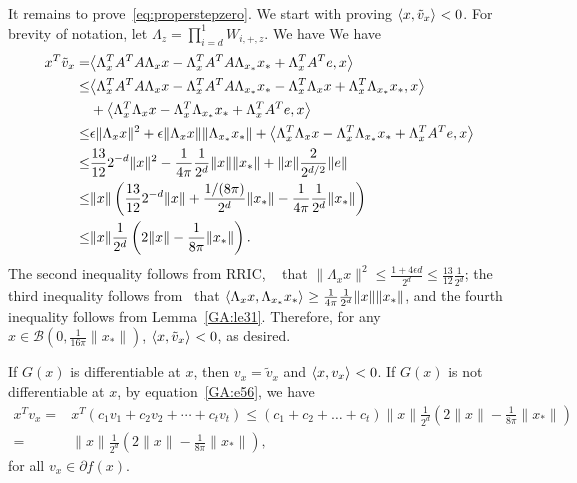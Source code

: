 It remains to prove~\eqref{eq:properstepzero}.
We start with proving $\inner[]{x}{\tilde{v}_x} < 0$.
For brevity of notation, let $\Lambda_{z} = \prod_{i = d}^1 W_{i, +, z}$. We have
We have
\begin{align*}
x^T \tilde{v}_x =&
\inner[]{ \Lambda_x^T A^T A \Lambda_x x - \Lambda_x^T A^T A \Lambda_{x_*} x_* + \Lambda_x^T A^T e }{x} \\
\leq& \inner[]{ \Lambda_x^T A^T A \Lambda_x x - \Lambda_x^T A^T A \Lambda_{x_*} x_* - \Lambda_x^T \Lambda_x x + \Lambda_x^T \Lambda_{x_*} x_* }{x} \\
&+ \inner[]{ \Lambda_x^T \Lambda_x x - \Lambda_x^T \Lambda_{x_*} x_* + \Lambda_x^T A^T e }{x}  \\
\leq& \epsilon \|\Lambda_x x\|^2 + \epsilon \|\Lambda_x x\| \|\Lambda_{x_*} x_*\| + \inner[]{ \Lambda_x^T \Lambda_x x - \Lambda_x^T \Lambda_{x_*} x_* + \Lambda_x^T A^T e }{x}  \\
\leq&
\frac{13}{12}2^{-d} \|x\|^2 - \frac{1}{4 \pi} \frac{1}{2^d} \|x\| \|x_*\| +
\|x\| \frac{2}{2^{d/2}} \|e\| \\
\leq&
\|x\| \left( \frac{13}{12}2^{-d} \|x\| +
\frac{1/(8\pi)}{2^{d}} \|x_*\|
- \frac{1}{4 \pi} \frac{1}{2^d} \|x_*\| \right) \\
\leq&
\|x\| \frac{1}{2^d} \left( 2\|x\| - \frac{1}{8 \pi} \|x_*\| \right).
\end{align*}
The second inequality follows from RRIC, ~\cite[(10)]{HV17} that $\|\Lambda_x x\|^2 \leq \frac{1+4\epsilon d}{2^d} \leq \frac{13}{12} \frac{1}{2^d}$; the third inequality follows from~\cite[Lemma~6]{HV17} that $\inner[]{\Lambda_x x}{\Lambda_{x_*} x_*} \geq \frac{1}{4 \pi} \frac{1}{2^d} \|x\| \|x_*\|$, and the fourth inequality follows from Lemma~\ref{GA:le31}.
Therefore, for any $x \in \mathcal{B}(0, \frac{1}{16\pi} \|x_*\|)$, $\inner[]{x}{ \tilde{v}_{x} } < 0$,  as desired.

If $G(x)$ is differentiable at $x$, then $v_x = \tilde{v}_x$ and $\inner[]{x}{{v}_x} < 0$. If $G(x)$ is not differentiable at $x$, by equation~\eqref{GA:e56}, we have
\begin{align*}
x^T {v}_x =& x^T (c_1 v_1 + c_2 v_2 + \cdots + c_t v_t) \leq (c_1 + c_2 + \ldots + c_t) \|x\| \frac{1}{2^d} \left( 2\|x\| - \frac{1}{8 \pi} \|x_*\| \right) \\
=& \|x\| \frac{1}{2^d} \left( 2\|x\| - \frac{1}{8 \pi} \|x_*\| \right),
\end{align*}
for all $v_x \in \partial f(x)$.

